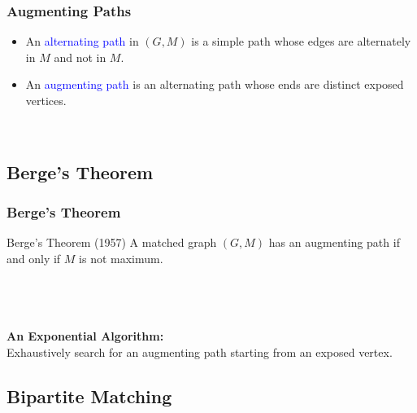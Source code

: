 \documentclass[pdftex]{beamer}
\newcommand{\blue}[1]{\textcolor{blue}{#1}}
\begin{document}
\begin{frame} \frametitle{Augmenting Paths}
  \begin{itemize}
  \item An \blue{alternating path} in $(G, M)$ is a simple path whose
    edges are alternately in $M$ and not in $M$.
  \item An \blue{augmenting path} is an alternating path whose ends
    are distinct exposed vertices.
  \end{itemize}
  \begin{center}
    \hfill
    \hfill
    \hfill~
  \end{center}
\end{frame}

\subsection{Berge's Theorem}

\begin{frame} \frametitle{Berge's Theorem}
  \begin{block}{Berge's Theorem (1957)}
    A matched graph $(G, M)$ has an augmenting path if and only if $M$
    is not maximum.
  \end{block}
  \begin{columns}[T]
    \begin{column}{.5\textwidth}
      \centering \\[4ex]
    \end{column}
    \begin{column}{.5\textwidth}
      \\
    \end{column}
  \end{columns}
  \vspace{2ex}
  \textbf{An Exponential Algorithm:}\\
  Exhaustively search for an augmenting path starting from an exposed
  vertex.
\end{frame}


\subsection{Bipartite Matching}
\end{document}

